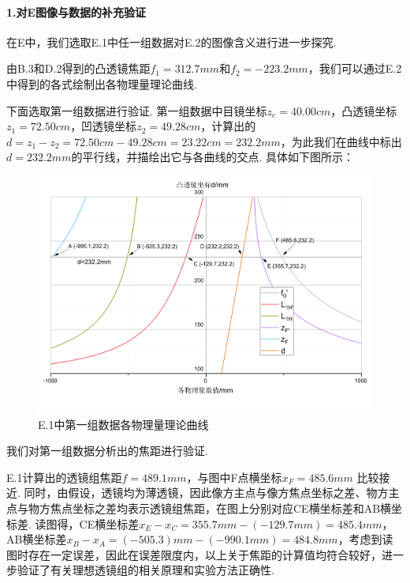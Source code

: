\documentclass[UTF8]{ctexart}
\begin{document}
\paragraph{1.\quad 对E图像与数据的补充验证}\quad\par
在E中，我们选取E.1中任一组数据对E.2的图像含义进行进一步探究.\par
由B.3和D.2得到的凸透镜焦距$f_1=312.7mm$和$f_2=-223.2mm$，我们可以通过E.2中得到的各式绘制出各物理量理论曲线.\par
下面选取第一组数据进行验证. 第一组数据中目镜坐标$z_e=40.00cm$，凸透镜坐标$z_1=72.50cm$，凹透镜坐标$z_2=49.28cm$，计算出的$d=z_1-z_2=72.50cm-49.28cm=23.22cm=232.2mm$，为此我们在曲线中标出$d=232.2mm$的平行线，并描绘出它与各曲线的交点. 具体如下图所示：
\begin{center}\begin{figure}[H]
    \includegraphics[scale=0.5]{graph1.pdf}
    \caption{E.1中第一组数据各物理量理论曲线}
    \vspace{-2.5em}
\end{figure}\end{center}
我们对第一组数据分析出的焦距进行验证.\par
\quad E.1计算出的透镜组焦距$f=489.1mm$，与图中F点横坐标$x_F=485.6mm$
比较接近. 同时，由假设，透镜均为薄透镜，因此像方主点与像方焦点坐标之差、物方主点与物方焦点坐标之差均表示透镜组焦距，在图上分别对应CE横坐标差和AB横坐标差. 读图得，CE横坐标差$x_E-x_C=355.7mm-(-129.7mm)=485.4mm$，AB横坐标差$x_B-x_A=(-505.3)mm-(-990.1mm)=484.8mm$，考虑到读图时存在一定误差，因此在误差限度内，以上关于焦距的计算值均符合较好，进一步验证了有关理想透镜组的相关原理和实验方法正确性.
\end{document}
